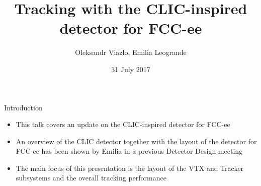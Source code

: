 \documentclass[8pt]{beamer}
\newif\ifplacelogo %
\begin{document}
\newcommand{\myNode}{\tikz[baseline,inner sep=1pt] \node[anchor=base]}



\title[ CLIC-inspired detector for FCC-ee \hspace{13.5em}\insertframenumber/
\inserttotalframenumber]{ Tracking with the CLIC-inspired detector for FCC-ee }


	\author[Oleksandr Viazlo, Emilia Leogrande]{Oleksandr Viazlo, Emilia Leogrande \\ 
	}
	
       
	\date{31 July 2017}


	
   	\frame{\titlepage}

   	

\placelogofalse

\begin{frame}{\large \large Introduction}
 
 \begin{itemize}
  \item This talk covers an update on the CLIC-inspired detector for FCC-ee
  \item An overview of the CLIC detector together with the layout of the detector for FCC-ee has been shown by Emilia in a previous Detector Design meeting
  \item The main focus of this presentation is the layout of the VTX and Tracker subsystems and the overall tracking performance
 \end{itemize}

 
\end{frame}
\end{document}
